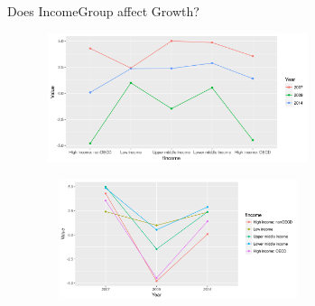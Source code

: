 \documentclass[9pt]{beamer}
\begin{document}
\begin{frame}{Does IncomeGroup affect Growth?}
	\begin{block}{}
		\includegraphics[height=3.8cm,width = 10cm]{Income1.png}
	\end{block}
	\begin{block}{}
		\includegraphics[height=3.5cm,width = 10cm]{Income2.png}
	\end{block}
\end{frame}
\end{document}
